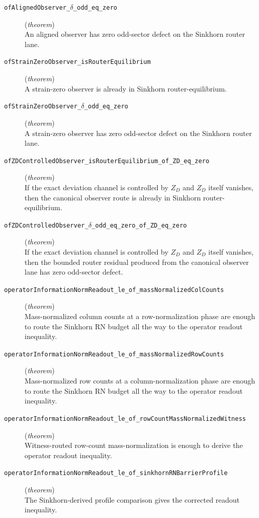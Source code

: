 \documentclass[11pt,a4paper]{article}
\begin{document}
\begin{description}
  \item[\texttt{ofAlignedObserver\_$\delta $\_odd\_eq\_zero}] (\textit{theorem}) \\ An aligned observer has zero odd-sector defect on the Sinkhorn router lane.
  \item[\texttt{ofStrainZeroObserver\_isRouterEquilibrium}] (\textit{theorem}) \\ A strain-zero observer is already in Sinkhorn router-equilibrium.
  \item[\texttt{ofStrainZeroObserver\_$\delta $\_odd\_eq\_zero}] (\textit{theorem}) \\ A strain-zero observer has zero odd-sector defect on the Sinkhorn router lane.
  \item[\texttt{ofZDControlledObserver\_isRouterEquilibrium\_of\_ZD\_eq\_zero}] (\textit{theorem}) \\ If the exact deviation channel is controlled by $Z_D$ and $Z_D$ itself 
vanishes, then the canonical observer route is already in Sinkhorn 
router-equilibrium.
  \item[\texttt{ofZDControlledObserver\_$\delta $\_odd\_eq\_zero\_of\_ZD\_eq\_zero}] (\textit{theorem}) \\ If the exact deviation channel is controlled by $Z_D$ and $Z_D$ itself 
vanishes, then the bounded router residual produced from the canonical observer 
lane has zero odd-sector defect.
  \item[\texttt{operatorInformationNormReadout\_le\_of\_massNormalizedColCounts}] (\textit{theorem}) \\ Mass-normalized column counts at a row-normalization phase are enough to route 
the Sinkhorn RN budget all the way to the operator readout inequality.
  \item[\texttt{operatorInformationNormReadout\_le\_of\_massNormalizedRowCounts}] (\textit{theorem}) \\ Mass-normalized row counts at a column-normalization phase are enough to route 
the Sinkhorn RN budget all the way to the operator readout inequality.
  \item[\texttt{operatorInformationNormReadout\_le\_of\_rowCountMassNormalizedWitness}] (\textit{theorem}) \\ Witness-routed row-count mass-normalization is enough to derive the operator 
readout inequality.
  \item[\texttt{operatorInformationNormReadout\_le\_of\_sinkhornRNBarrierProfile}] (\textit{theorem}) \\ The Sinkhorn-derived profile comparison gives the corrected readout inequality.

\end{description}
\end{document}
